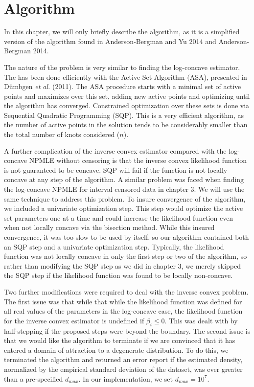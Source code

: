 \documentclass[11pt]{article}
\numberwithin{equation}{section}
\begin{document}
{\section{Algorithm} }
	
	In this chapter, we will only briefly describe the algorithm, as it is a simplified version of the algorithm found in Anderson-Bergman and Yu 2014 and Anderson-Bergman 2014. 
	
	 The nature of the problem is very similar to finding the log-concave estimator. The has been done efficiently with the Active Set Algorithm (ASA), presented in D\"umbgen \emph{et al.} (2011). The ASA procedure starts with a minimal set of active points and maximizes over this set, adding new active points and optimizing until the algorithm has converged. Constrained optimization over these sets is done via Sequential Quadratic Programming (SQP). This is a very efficient algorithm, as the number of active points in the solution tends to be considerably smaller than the total number of knots considered ($n$). 
	
	A further complication of the inverse convex estimator compared with the log-concave NPMLE without censoring is that the inverse convex likelihood function is not guaranteed to be concave. SQP will fail if the function is not locally concave at any step of the algorithm. A similar problem was faced when finding the log-concave NPMLE for interval censored data in chapter 3. We will use the same technique to address this problem. To insure convergence of the algorithm, we included a univariate optimization step. This step would optimize the active set parameters one at a time and could increase the likelihood function even when not locally concave via the bisection method. While this insured convergence, it was too slow to be used by itself, so our algorithm contained both an SQP step and a univariate optimization step. Typically, the likelihood function was not locally concave in only the first step or two of the algorithm, so rather than modifying the SQP step as we did in chapter 3, we merely skipped the SQP step if the likelihood function was found to be locally non-concave. 

	Two further modifications were required to deal with the inverse convex problem. The first issue was that while that while the likelihood function was defined for all real values of the parameters in the log-concave case, the likelihood function for the inverse convex estimator is undefined if $\beta_i \leq 0$. This was dealt with by half-stepping if the proposed steps were beyond the boundary. The second issue is that we would like the algorithm to terminate if we are convinced that it has entered a domain of attraction to a degenerate distribution. To do this, we terminated the algorithm and returned an error report if the estimated density, normalized by the empirical standard deviation of the dataset, was ever greater than a pre-specified $d_{max}$. In our implementation, we set $d_{max} = 10^7$. 
	
\end{document}
